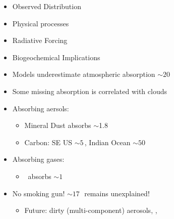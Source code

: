 \documentclass[final,dvips]{foils}
\begin{document}
\rotatefoilhead{\bgl
\Large\textcolor{blue}{\hfill Outline \hfill}}\vspace{-0.5in}\large
\begin{itemize}
\item Observed Distribution
\item Physical processes
\item Radiative Forcing
\item Biogeochemical Implications
\end{itemize}

\rotatefoilhead{\bgl\Large\textcolor{blue}{\hfill Conclusions \hfill}}\large\vspace{-0.5in} 
\enlargethispage*{1in} 
\begin{itemize}
\item Models underestimate atmospheric absorption $\sim 20$\,\wxmS
\item Some missing absorption is correlated with clouds
\item Absorbing aersols:
\begin{itemize}
\item Mineral Dust absorbs $\sim$1.8\,\wxmS 
\item Carbon: SE US $\sim 5$\,\wxmS, Indian Ocean $\sim 50$\,\wxmS
\end{itemize}
\item Absorbing gases:
\begin{itemize}
\item \OdX\ absorbs $\sim 1$\,\wxmS
\end{itemize}
\item No smoking gun! $\sim 17$\,\wxmS\ remains unexplained!
\begin{itemize}
\item Future: dirty (multi-component) aerosols, \NOd, \HdO
\end{itemize}
\end{itemize}
\end{document}
